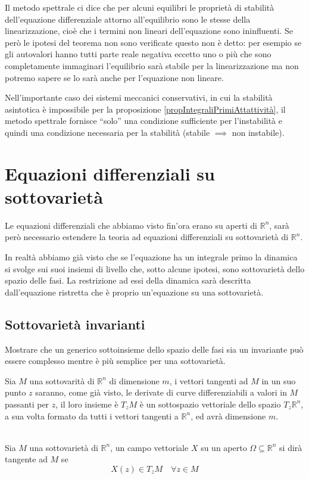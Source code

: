 \documentclass[11pt,a4paper,twoside]{book}
\newenvironment{definizione}[1][\empty]{\begin{Definizione}{
\ifx\empty#1\relax\else\mdseries\itshape#1\\\fi
}{}}{\end{Definizione}}
\theoremstyle{esss}
\theoremstyle{dotless}
\numberwithin{equation}{section} %
\begin{document}
Il metodo spettrale ci dice che per alcuni equilibri le proprietà di stabilità dell'equazione differenziale attorno all'equilibrio sono le stesse della linearizzazione, cioè che i termini non lineari dell'equazione sono ininfluenti.
Se però le ipotesi del teorema non sono verificate questo non è detto: per esempio se gli autovalori hanno tutti parte reale negativa eccetto uno o più che sono completamente immaginari l'equilibrio sarà stabile per la linearizzazione ma non potremo sapere se lo sarà anche per l'equazione non lineare.

Nell'importante caso dei sistemi meccanici conservativi, in cui la stabilità asintotica è impossibile per la proposizione \ref{propIntegraliPrimiAttattività}, il metodo spettrale fornisce ``solo'' una condizione sufficiente per l'instabilità e quindi una condizione necessaria per la stabilità (stabile $\implies$ non instabile).

\section{Equazioni differenziali su sottovarietà}
Le equazioni differenziali che abbiamo visto fin'ora erano su aperti di $\mathbb{R}^n$, sarà però necessario estendere la teoria ad equazioni differenziali su sottovarietà di $\mathbb{R}^n$. 

In realtà abbiamo già visto che se l'equazione ha un integrale primo la dinamica si svolge sui suoi insiemi di livello che, sotto alcune ipotesi, sono sottovarietà dello spazio delle fasi. La restrizione ad essi della dinamica sarà descritta dall'equazione ristretta che è proprio un'equazione su una sottovarietà.

\subsection{Sottovarietà invarianti}\label{sezSottovarietàInvarianti}
Mostrare che un generico sottoinsieme dello spazio delle fasi sia un invariante può essere complesso mentre è più semplice per una sottovarietà.

Sia $M$ una sottovarità di $\mathbb{R}^n$ di dimensione $m$, i vettori tangenti ad $M$ in un suo punto $z$ saranno, come già visto, le derivate di curve differenziabili a valori in $M$ passanti per $z$, il loro insieme è $T_zM$ è un sottospazio vettoriale dello spazio $T_z\mathbb{R}^n$, a sua volta formato da tutti i vettori tangenti a $\mathbb{R}^n$, ed avrà dimensione $m$.

\begin{definizione}
Sia $M$ una sottovarietà di $\mathbb{R}^n$, un campo vettoriale $X$ su un aperto $\Omega\subseteq\mathbb{R}^n$ si dirà tangente ad $M$ se
\[
X(z)\in T_zM \quad\forall z\in M
\]
\end{definizione}
\end{document}
